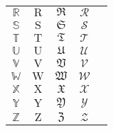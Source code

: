 \documentclass{article}
\begin{document}
\begin{table}[htbp]
\begin{tabular}{@{}ccccc@{}}
        \( \mathbb{R} \) & \( \mathrm{R} \) & \( \mathfrak{R} \) & \( \mathcal{R} \) &  \\
        \( \mathbb{S} \) & \( \mathrm{S} \) & \( \mathfrak{S} \) & \( \mathcal{S} \) &  \\
        \( \mathbb{T} \) & \( \mathrm{T} \) & \( \mathfrak{T} \) & \( \mathcal{T} \) &  \\
        \( \mathbb{U} \) & \( \mathrm{U} \) & \( \mathfrak{U} \) & \( \mathcal{U} \) &  \\
        \( \mathbb{V} \) & \( \mathrm{V} \) & \( \mathfrak{V} \) & \( \mathcal{V} \) &  \\
        \( \mathbb{W} \) & \( \mathrm{W} \) & \( \mathfrak{W} \) & \( \mathcal{W} \) &  \\
        \( \mathbb{X} \) & \( \mathrm{X} \) & \( \mathfrak{X} \) & \( \mathcal{X} \) &  \\
        \( \mathbb{Y} \) & \( \mathrm{Y} \) & \( \mathfrak{Y} \) & \( \mathcal{Y} \) &  \\
        \( \mathbb{Z} \) & \( \mathrm{Z} \) & \( \mathfrak{Z} \) & \( \mathcal{Z} \) &  \\ \bottomrule
        \end{tabular}
    \end{table}
\end{document}
